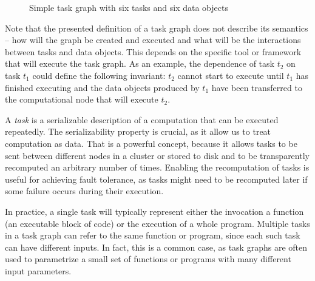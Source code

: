 \begin{figure}[h]
	\centering
	\caption{Simple task graph with six tasks and six data objects}
	\label{fig:task-graph-example}
\end{figure}

Note that the presented definition of a task graph does not describe its semantics -- how will the
graph be created and executed and what will be the interactions between tasks and data objects.
This depends on the specific tool or framework that will execute the task graph. As an example, the
dependence of task $t_2$ on task $t_1$ could define the following
invariant: $t_2$ cannot start to execute until $t_1$ has finished
executing and the data objects produced by $t_1$ have been transferred to the
computational node that will execute $t_2$.

A \emph{task} is a serializable description of a computation that can be executed
repeatedly. The serializability property is crucial, as it allow us to treat computation as data.
That is a powerful concept, because it allows tasks to be sent between different nodes in a cluster
or stored to disk and to be transparently recomputed an arbitrary number of times. Enabling the
recomputation of tasks is useful for achieving fault tolerance, as tasks might need to be
recomputed later if some failure occurs during their execution.

In practice, a single task will typically represent either the invocation a function (an executable
block of code) or the execution of a whole program. Multiple tasks in a task graph can refer to the
same function or program, since each such task can have different inputs. In fact, this is a common
case, as task graphs are often used to parametrize a small set of functions or programs with many
different input parameters.

